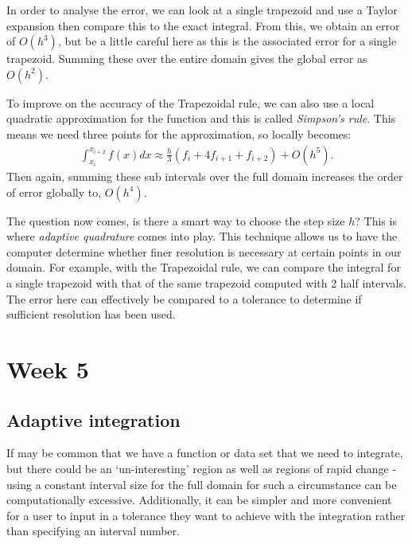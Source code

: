\documentclass[11pt,a4paper]{report}
\begin{document}
	In order to analyse the error, we can look at a single trapezoid and use a Taylor expansion then compare this to the exact integral. From this, we obtain an error of $O(h^3)$, but be a little careful here as this is the associated error for a single trapezoid. Summing these over the entire domain gives the global error as $O(h^2)$.
	
	To improve on the accuracy of the Trapezoidal rule, we can also use a local quadratic approximation for the function and this is called \textit{Simpson's rule}. This means we need three points for the approximation, so locally becomes:
	\begin{align}
	\int_{x_i}^{x_{i+2}} f(x) dx \approx \frac{h}{3} (f_i + 4f_{i+1} + f_{i+2}) + O(h^5).
	\end{align}
	Then again, summing these sub intervals over the full domain increases the order of error globally to, $O(h^4)$.
	
	The question now comes, is there a smart way to choose the step size $h$? This is where \textit{adaptive quadrature} comes into play. This technique allows us to have the computer determine whether finer resolution is necessary at certain points in our domain. For example, with the Trapezoidal rule, we can compare the integral for a single trapezoid with that of the same trapezoid computed with 2 half intervals. The error here can effectively be compared to a tolerance to determine if sufficient resolution has been used. 
	
	\newpage
	\section{Week 5}
	\subsection{Adaptive integration}
	If may be common that we have a function or data set that we need to integrate, but there could be an `un-interesting' region as well as regions of rapid change - using a constant interval size for the full domain for such a circumstance can be computationally excessive. Additionally, it can be simpler and more convenient for a user to input in a tolerance they want to achieve with the integration rather than specifying an interval number.
\end{document}
